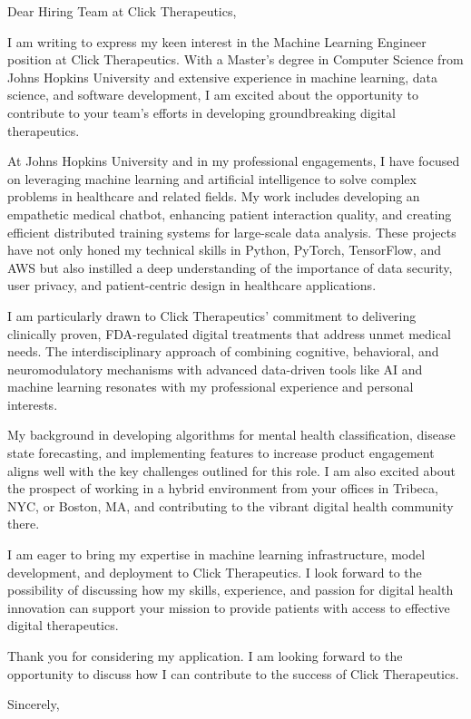 \documentclass{ExpressiveResume}
\begin{document}
\resumeheader[
    firstname=Vijay Murari,
    middleinitial=,
    lastname=Tiyyala
]

\begin{comment}
Cover Letter for Click Therapeutics Machine Learning Engineer Position
\end{comment}

\opening{Dear Hiring Team at Click Therapeutics,}

I am writing to express my keen interest in the Machine Learning Engineer position at Click Therapeutics. With a Master's degree in Computer Science from Johns Hopkins University and extensive experience in machine learning, data science, and software development, I am excited about the opportunity to contribute to your team's efforts in developing groundbreaking digital therapeutics.

At Johns Hopkins University and in my professional engagements, I have focused on leveraging machine learning and artificial intelligence to solve complex problems in healthcare and related fields. My work includes developing an empathetic medical chatbot, enhancing patient interaction quality, and creating efficient distributed training systems for large-scale data analysis. These projects have not only honed my technical skills in Python, PyTorch, TensorFlow, and AWS but also instilled a deep understanding of the importance of data security, user privacy, and patient-centric design in healthcare applications.

I am particularly drawn to Click Therapeutics' commitment to delivering clinically proven, FDA-regulated digital treatments that address unmet medical needs. The interdisciplinary approach of combining cognitive, behavioral, and neuromodulatory mechanisms with advanced data-driven tools like AI and machine learning resonates with my professional experience and personal interests.

My background in developing algorithms for mental health classification, disease state forecasting, and implementing features to increase product engagement aligns well with the key challenges outlined for this role. I am also excited about the prospect of working in a hybrid environment from your offices in Tribeca, NYC, or Boston, MA, and contributing to the vibrant digital health community there.

I am eager to bring my expertise in machine learning infrastructure, model development, and deployment to Click Therapeutics. I look forward to the possibility of discussing how my skills, experience, and passion for digital health innovation can support your mission to provide patients with access to effective digital therapeutics.

Thank you for considering my application. I am looking forward to the opportunity to discuss how I can contribute to the success of Click Therapeutics.

\closing{Sincerely,}

\signature{Vijay Murari Tiyyala}
\end{document}
